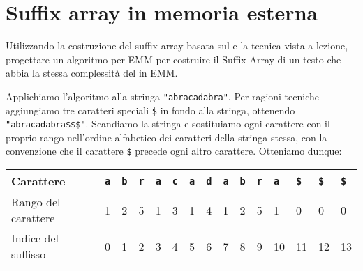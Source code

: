\chapter{Suffix array in memoria esterna}

\begin{problem*}
  Utilizzando la costruzione del suffix array basata sul \mergesort e la tecnica
  \dc vista a lezione, progettare un algoritmo per EMM per costruire il Suffix
  Array di un testo che abbia la stessa complessit\`a del \mergesort in EMM.
\end{problem*}

Applichiamo l'algoritmo \dc alla stringa \texttt{\string"abracadabra\string"}. 
Per ragioni tecniche aggiungiamo tre caratteri speciali \texttt{\$} in fondo alla 
stringa, ottenendo \texttt{\string"abracadabra\$\$\$\string"}. Scandiamo la 
stringa e sostituiamo ogni carattere con il proprio rango nell'ordine alfabetico 
dei caratteri della stringa stessa, con la convenzione che il carattere 
\texttt{\$} precede ogni altro carattere. Otteniamo dunque:
\begin{table}[H]
  \begin{tabularx}{\linewidth}{l*{14}{X}}
    Carattere              & \texttt{a} & \texttt{b} & \texttt{r} & \texttt{a}
                           & \texttt{c} & \texttt{a} & \texttt{d} & \texttt{a}
                           & \texttt{b} & \texttt{r} & \texttt{a} & \texttt{\$}
                           & \texttt{\$} & \texttt{\$} \\
    \hline
    Rango del carattere    & 1 & 2 & 5 & 1 & 3 & 1 & 4 & 1 & 2 & 5 & 1 & 0 & 0 & 0 \\
    Indice del suffisso    & 0 & 1 & 2 & 3 & 4 & 5 & 6 & 7 & 8 & 9 & 10 & 11 & 12 & 13 \\
  \end{tabularx}
\end{table}

